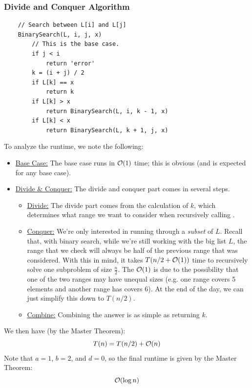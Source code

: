 \documentclass[letterpaper]{article}
\begin{document}
\subsubsection{Divide and Conquer Algorithm}
\begin{verbatim}
    // Search between L[i] and L[j]
    BinarySearch(L, i, j, x)
        // This is the base case. 
        if j < i
            return 'error'
        k = (i + j) / 2
        if L[k] == x
            return k
        if L[k] > x
            return BinarySearch(L, i, k - 1, x)
        if L[k] < x 
            return BinarySearch(L, k + 1, j, x)
\end{verbatim}
To analyze the runtime, we note the following:
\begin{itemize}
    \item \underline{Base Case:} The base case runs in $\mathcal{O}(1)$ time; this is obvious (and is expected for any base case).
    \item \underline{Divide \& Conquer:} The divide and conquer part comes in several steps. 
    \begin{itemize}
        \item \underline{Divide:} The divide part comes from the calculation of $k$, which determines what range we want to consider when recursively calling .
        \item \underline{Conquer:} We're only interested in running through a \emph{subset} of $L$. Recall that, with binary search, while we're still working with the big list $L$, the range that we check will always be half of the previous range that was considered. With this in mind, it takes $T(n / 2 + \mathcal{O}(1))$ time to recursively solve one subproblem of size $\frac{n}{2}$. The $\mathcal{O}(1)$ is due to the possibility that one of the two ranges may have unequal sizes (e.g. one range covers 5 elements and another range has covers 6). At the end of the day, we can just simplify this down to $T(n / 2)$. 
        \item \underline{Combine:} Combining the answer is as simple as returning $k$. 
    \end{itemize}
\end{itemize}
We then have (by the Master Theorem):
\[T(n) = T(n / 2) + \mathcal{O}(n)\]
Note that $a = 1$, $b = 2$, and $d = 0$, so the final runtime is given by the Master Theorem:
\[\mathcal{O}(\log n)\]
\end{document}
